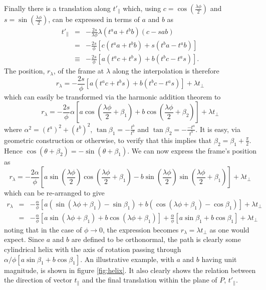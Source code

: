 Finally there is a translation along $t'_\parallel$ which, 
using $c = \cos\left(\frac{\lambda \phi}{2}\right)$ and $s = \sin\left(\frac{\lambda \phi}{2}\right)$,
can be expressed in terms of $a$ and $b$ as
\begin{eqnarray*}
t'_\parallel & = & - \frac{2s}{\lambda\phi} \lambda (t^a a + t^b b) (c - sab) \\
& = & -\frac{2s}{\phi} \left[c (t^a a + t^b b) + s ( t^b a - t^a b) \right]\\
& \equiv & -\frac{2s}{\phi} \left[a (t^a c + t^b s) + b ( t^b c - t^a s)\right].
\end{eqnarray*}
The position, $r_\lambda$, of the frame at $\lambda$ along the interpolation is therefore
\[
r_\lambda = -\frac{2s}{\phi} [a (t^a c + t^b s) + b ( t^b c - t^a s)] + \lambda t_\perp
\]
which can easily be transformed via the harmonic addition theorem to
\[
r_\lambda = -\frac{2s}{\phi} \alpha \left[ a \cos\left(\frac{\lambda\phi}{2} + \beta_1\right) + b \cos\left(\frac{\lambda\phi}{2} + \beta_2\right) \right] + \lambda t_\perp
\]
where $\alpha^2 = (t^a)^2 + (t^b)^2$, $\tan \beta_1 = - \frac{t^b}{t^a}$ and $\tan \beta_2 = - \frac{-t^a}{t^b}$. 
It is easy, via geometric construction or otherwise, to verify that this implies
that $\beta_2 = \beta_1 + \frac{\pi}{2}$. Hence $\cos(\theta + \beta_2) = - \sin(\theta + \beta_1)$. We can now express the frame's position as
\[
r_\lambda = -\frac{2\alpha}{\phi} \left[ a \sin\left(\frac{\lambda\phi}{2}\right)\cos\left(\frac{\lambda\phi}{2} + \beta_1\right) - b \sin\left(\frac{\lambda\phi}{2}\right)\sin\left(\frac{\lambda\phi}{2} + \beta_1\right) \right] + \lambda t_\perp
\]
which can be re-arranged to give
\begin{eqnarray*}
r_\lambda & = & -\frac{\alpha}{\phi} \left[ a \left(\sin\left(\lambda\phi + \beta_1\right) - \sin\beta_1\right)
+ b \left(\cos\left(\lambda\phi + \beta_1\right) - \cos\beta_1\right) \right] + \lambda t_\perp \\
& = & -\frac{\alpha}{\phi} \left[ a \sin\left(\lambda\phi + \beta_1\right)
+ b \cos\left(\lambda\phi + \beta_1\right) \right] + \frac{\alpha}{\phi} \left[
a \sin \beta_1 + b \cos \beta_1
\right] + \lambda t_\perp 
\end{eqnarray*}
noting that in the case of $\phi \rightarrow 0$, the expression becomes $r_\lambda = \lambda t_\perp$ as one would
expect. Since $a$ and $b$ are defined to be orthonormal, the path is clearly some cylindrical helix with the axis of rotation passing through 
$\alpha/\phi  \left[ a \sin \beta_1 + b \cos \beta_1 \right]$.
An illustrative example, with $a$ and $b$ having
unit magnitude, is shown in figure \ref{fig:helix}. It also clearly shows the relation between the direction of
vector $t_\parallel$ and the final translation within the plane of $P$, $t'_\parallel$.

